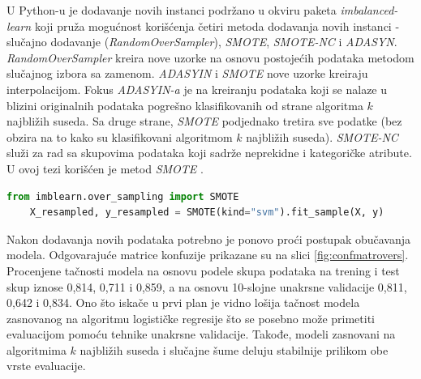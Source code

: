\documentclass[12pt,oneside]{memoir}
\begin{document}

U Python-u je dodavanje novih instanci podržano u okviru paketa \textit{imbalanced-learn} koji pruža mogućnost korišćenja četiri metoda dodavanja novih instanci - slučajno dodavanje (\textit{RandomOverSampler}), \textit{SMOTE}, \textit{SMOTE-NC} i \textit{ADASYN}. \textit{RandomOverSampler} kreira nove uzorke na osnovu postojećih podataka metodom slučajnog izbora sa zamenom. \textit{ADASYIN} i \textit{SMOTE} nove uzorke kreiraju interpolacijom. Fokus \textit{ADASYIN-a} je na kreiranju podataka koji se nalaze u blizini originalnih podataka pogrešno klasifikovanih od strane algoritma $k$ najbližih suseda. Sa druge strane, \textit{SMOTE} podjednako tretira sve podatke (bez obzira na to kako su klasifikovani algoritmom $k$ najbližih suseda). \textit{SMOTE-NC} služi za rad sa skupovima podataka koji sadrže neprekidne i kategoričke atribute. U ovoj tezi korišćen je metod \textit{SMOTE} \cite{imblearn}.

\begin{lstlisting}[language=Python, basicstyle=\tiny]
	from imblearn.over_sampling import SMOTE
	X_resampled, y_resampled = SMOTE(kind="svm").fit_sample(X, y)
\end{lstlisting}

Nakon dodavanja novih podataka potrebno je ponovo proći postupak obučavanja modela. Odgovarajuće matrice konfuzije prikazane su na slici \ref{fig:confmatrovers}. Procenjene tačnosti modela na osnovu podele skupa podataka na trening i test skup iznose 0,814, 0,711 i 0,859, a na osnovu 10-slojne unakrsne validacije 0,811, 0,642 i 0,834. Ono što iskače u prvi plan je vidno lošija tačnost modela zasnovanog na algoritmu logističke regresije što se posebno može primetiti evaluacijom pomoću tehnike unakrsne validacije. Takođe, modeli zasnovani na algoritmima $k$ najbližih suseda i slučajne šume deluju stabilnije prilikom obe vrste evaluacije. 
\end{document}
